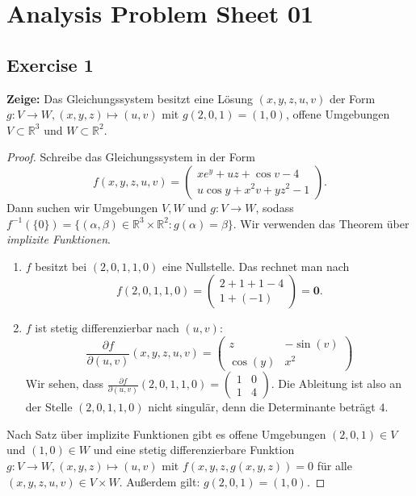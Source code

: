 \documentclass[a4paper, landscape,twocolumn,fontsize=9pt]{scrartcl}
\begin{document}
\section*{Analysis Problem Sheet 01}

\subsection*{Exercise 1}
\textbf{Zeige:} Das Gleichungssystem besitzt eine Lösung $(x,y,z,u,v)$ der Form $g: V \to W, (x,y,z) \mapsto (u,v)$ mit $g(2,0,1) = (1,0)$, offene Umgebungen $V \subset \mathbb R^3$ und $W \subset \mathbb R^2$.

\begin{proof}
Schreibe das Gleichungssystem in der Form
\[
	f(x,y,z,u,v) = \begin{pmatrix}
		xe^y +uz + \cos v - 4 \\
		u \cos y + x^2v + yz^2 - 1
	\end{pmatrix}.
\]
Dann suchen wir Umgebungen $V,W$ und $g: V \to W$, sodass $f^{-1}(\{ 0 \}) = \{ (\alpha, \beta) \in  \mathbb R^3 \times \mathbb R^2 : g(\alpha) = \beta \}$. Wir verwenden das Theorem über \emph{implizite Funktionen}.

\begin{enumerate}
\item $f$ besitzt bei $(2,0,1,1,0)$ eine Nullstelle. Das rechnet man nach
\[
	f(2,0,1,1,0) = \begin{pmatrix}
		2 + 1 + 1 - 4 \\
		1 + (-1)
	\end{pmatrix} = \mathbf 0.
\]

\item $f$ ist stetig differenzierbar nach $(u,v)$: 
\[
	\frac{\partial f}{\partial (u,v)} (x,y,z,u,v) = \begin{pmatrix}
	z & -\sin(v) \\
	\cos(y) & x^2
	\end{pmatrix}
\]
Wir sehen, dass $\frac{\partial f}{\partial (u,v)}(2,0,1,1,0) = \begin{pmatrix}
1 & 0 \\ 1 & 4
\end{pmatrix}$. Die Ableitung ist also an der Stelle $(2,0,1,1,0)$ nicht singulär, denn die Determinante beträgt $4$.
\end{enumerate}

Nach Satz über implizite Funktionen gibt es offene Umgebungen $(2,0,1) \in V$ und $(1,0) \in W$ und eine stetig differenzierbare Funktion $g: V \to W, (x,y,z) \mapsto (u,v)$ mit $f(x,y,z, g(x,y,z)) = 0$ für alle $(x,y,z,u,v) \in V \times W$. Außerdem gilt: $g(2,0,1) = (1,0)$.
\end{proof}
\end{document}
